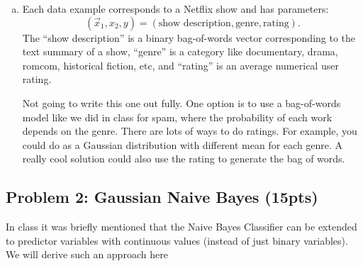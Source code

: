 \documentclass[10pt]{article}
\begin{document}
\begin{enumerate}[(a)]
	\item Each data example corresponds to a Netflix show and has parameters: $$(\vec{x}_1, x_2, y) = (\text{show description}, \text{genre}, \text{rating}).$$  The ``show description'' is a binary bag-of-words vector corresponding to the text summary of a show, ``genre'' is a category like documentary, drama, romcom, historical fiction, etc, and ``rating'' is an average numerical user rating.
	
	\color{blue}
 	Not going to write this one out fully. One option is to use a bag-of-words model like we did in class for spam, where the probability of each work depends on the genre. There are lots of ways to do ratings. For example, you could do as a Gaussian distribution with different mean for each genre. A really cool solution could also use the rating to generate the bag of words. 
	\color{black}
\end{enumerate}

\subsection{Problem 2: Gaussian Naive Bayes (15pts)}
In class it was briefly mentioned that the Naive Bayes Classifier can be extended to predictor variables with continuous values (instead of just binary variables). We will derive such an approach here
\end{document}
